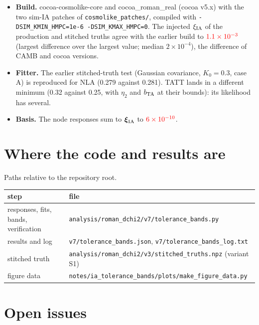 \documentclass[11pt]{article}
\newcommand{\bvec}[1]{\boldsymbol{#1}}
\newif\ifnumbersfinal
\newcommand{\refresh}[1]{\ifnumbersfinal#1\else\textcolor{red}{#1}\fi}
\newcommand{\PartitionCheck}{\refresh{6\times10^{-10}}}
\newcommand{\BuildCheck}{\refresh{1.1\times10^{-3}}}
\begin{document}
\begin{itemize}
  \item \textbf{Build.} cocoa-cosmolike-core and cocoa\_roman\_real (cocoa
    v5.x) with the two sim-IA patches of \texttt{cosmolike\_patches/},
    compiled with \texttt{-DSIM\_KMIN\_HMPC=1e-6 -DSIM\_KMAX\_HMPC=0}. The
    injected $\xi_{\rm IA}$ of the production and stitched truths agree with
    the earlier build to $\BuildCheck$ (largest difference over the largest
    value; median $2\times10^{-4}$), the difference of CAMB and cocoa
    versions.
  \item \textbf{Fitter.} The earlier stitched-truth test (Gaussian
    covariance, $K_0 = 0.3$, case A) is reproduced for NLA (0.279 against
    0.281). TATT lands in a different minimum (0.32 against 0.25, with
    $\eta_2$ and $b_{\rm TA}$ at their bounds): its likelihood has several.
  \item \textbf{Basis.} The node responses sum to $\bvec\xi_{\rm IA}$ to
    $\PartitionCheck$.
\end{itemize}

\section{Where the code and results are}
\label{app:code}

Paths relative to the repository root.

\begin{center}
  \small
  \begin{tabular}{ll}
    \toprule
    step & file \\
    \midrule
    responses, fits, bands, verification & \texttt{analysis/roman\_dchi2/v7/tolerance\_bands.py} \\
    results and log & \texttt{v7/tolerance\_bands.json}, \texttt{v7/tolerance\_bands\_log.txt} \\
    stitched truth & \texttt{analysis/roman\_dchi2/v3/stitched\_truths.npz} (variant S1) \\
    figure data & \texttt{notes/ia\_tolerance\_bands/plots/make\_figure\_data.py} \\
    \bottomrule
  \end{tabular}
\end{center}

\section{Open issues}
\label{app:open}
\end{document}
